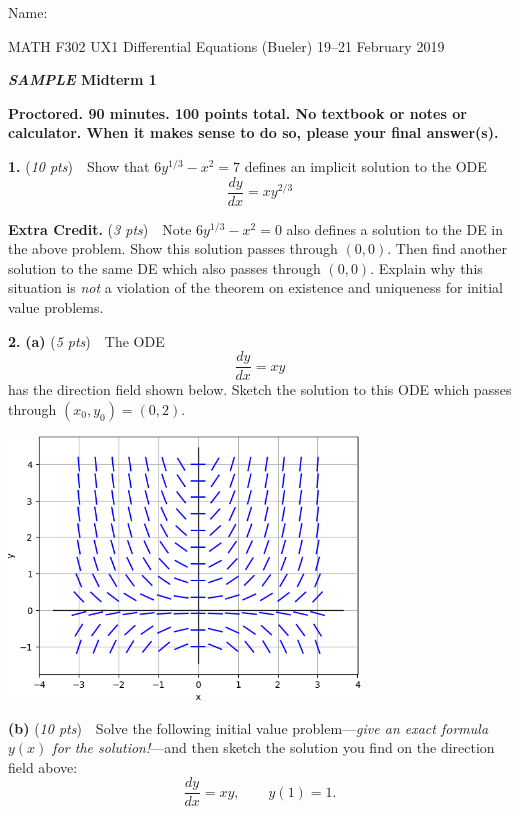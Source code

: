 \documentclass[11pt,reqno]{amsart}
\newcommand{\dydx}{\frac{dy}{dx}}
\newcommand{\prob}[1]{\bigskip\noindent\textbf{#1.} }
\newcommand{\pts}[1]{(\emph{#1 pts})}
\newcommand{\probpts}[2]{\prob{#1} \pts{#2} \,\,}
\newcommand{\ppartpts}[2]{\textbf{(#1)} \pts{#2} \,\,}
\newcommand{\epartpts}[2]{\medskip\noindent \textbf{(#1)} \pts{#2} \,\,}
\newcommand*\circled[1]{\tikz[baseline=(char.base)]{
            \node[shape=ellipse,draw,inner sep=2pt] (char) {#1};}}
\begin{document}
\hfill \Large Name:\underline{\phantom{Ed Bueler really really long long long name}}
\medskip

\scriptsize \noindent MATH F302 UX1 Differential Equations (Bueler) \hfill 19--21 February 2019
\medskip

\Large\centerline{\textbf{\textsl{SAMPLE} Midterm 1}}

\medskip
\large
\begin{center}
\textbf{Proctored.  90 minutes.  100 points total.  No textbook or notes or calculator.  When it makes sense to do so, please \circled{circle} your final answer(s).}
\end{center}

\bigskip
\thispagestyle{empty}
\normalsize

\probpts{1}{10}  Show that $6 y^{1/3} - x^2 = 7$ defines an implicit solution to the ODE
	$$\dydx = x y^{2/3}$$
\vfill

\probpts{Extra Credit}{3}  Note $6 y^{1/3} - x^2 = 0$ also defines a solution to the DE in the above problem.  Show this solution passes through $(0,0)$.  Then find another solution to the same DE which also passes through $(0,0)$.  Explain why this situation is \emph{not} a violation of the theorem on existence and uniqueness for initial value problems.
\vspace{2.0in}

\newpage
\prob{2} \ppartpts{a}{5}  The ODE 
	$$\dydx = xy$$
has the direction field shown below.  Sketch the solution to this ODE which passes through $(x_0,y_0)=(0,2)$.

\bigskip
\includegraphics[width=0.7\textwidth]{dirfieldxy}
\vspace{10mm}

\epartpts{b}{10}  Solve the following initial value problem---\emph{give an exact formula $y(x)$ for the solution!}---and then sketch the solution you find on the direction field above:
	$$\dydx = xy, \qquad y(1)=1.$$
\vfill
\end{document}
